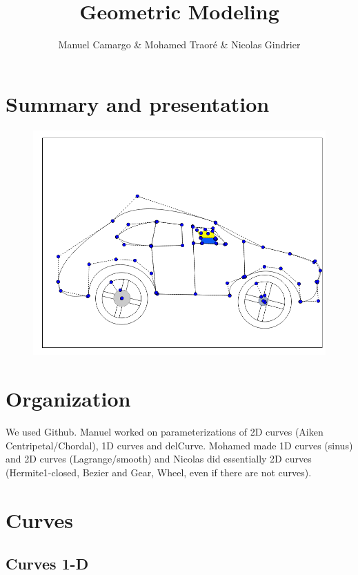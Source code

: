 \documentclass{article}
\title{Geometric Modeling}
\author{Manuel Camargo & Mohamed Traoré &  Nicolas Gindrier}
\date{}
\begin{document}
\maketitle
\section*{Summary and presentation}
\begin{figure}[H]
   \includegraphics[scale = 0.5]{Pictures/narutovoiture.png}
\end{figure}
\section*{Organization}
We used Github. Manuel worked on parameterizations of 2D curves (Aiken Centripetal/Chordal), 1D curves and delCurve. Mohamed made 1D curves (sinus) and 2D curves (Lagrange/smooth) and Nicolas did essentially 2D curves (Hermite1-closed, Bezier and Gear, Wheel, even if there are not curves). 
\section*{Curves}
\subsection*{Curves 1-D}
\end{document}
